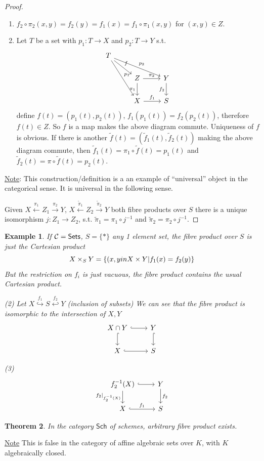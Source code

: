 \documentclass[11pt]{article}
\newtheorem{thm}{Theorem}[section]
\newtheorem{ex}[thm]{Example}
\newcommand{\calc}{{\cal C}}
\newcommand{\lrta}{\longrightarrow}
\newcommand{\inj}{\hookrightarrow}
\begin{document}
\begin{proof}
\ \begin{enumerate}[label=(\arabic*)]
\item $f_2\circ \pi_2(x,y)=f_2(y)=f_1(x)=f_1\circ \pi_1(x,y)$ for $(x,y)\in Z$.
\item Let $T$ be a set with $p_1:T\lrta X$ and $p_2:T\lrta Y$ s.t. $$\begin{tikzcd}
T \arrow[rdd,"p_1"] \arrow[rrd,"p_2"] \ar[rd,"f"] &  &  \\
 & Z \arrow[r, "\pi_2"] \arrow[d, "\pi_1"'] & Y \arrow[d, "f_2"'] \\
 & X \arrow[r, "f_1"] & S
\end{tikzcd}$$
define $f(t)=(p_1(t),p_2(t))$, $f_1(p_1(t))=f_2(p_2(t))$, therefore $f(t)\in Z$. So $f$ is a map makes the  above diagram commute. Uniqueness of $f$ is obvious. If there is  another $\tilde{f}(t)=(\tilde{f}_1(t),\tilde{f}_2(t))$ making the above diagram commute, then $\tilde{f}_1(t)=\pi_1\circ \tilde{f}(t)=p_1(t)$ and $\tilde{f}_2(t)=\pi\circ \tilde{f}(t)=p_2(t)$.
\end{enumerate}
\underline{Note}: This construction/definition is a an example of ``universal'' object in the categorical sense. It is universal in the following sense.

Given $X\overset{\pi_1}{\longleftarrow}Z_1\overset{\pi_2}{\lrta} Y$, $X\overset{\tilde{\pi}_1}{\longleftarrow}Z_2\overset{\tilde{\pi}_2}{\lrta} Y$ both fibre products over $S$ there is a unique isomorphism $j:Z_1\lrta Z_2$, s.t. $\tilde{\pi}_1=\pi_1\circ j^{-1}$ and $\tilde{\pi}_2=\pi_2\circ j^{-1}$.
\end{proof}
\begin{ex}
If $\calc=\mathsf{Sets}$, $S=\{*\}$ any 1 element set, the fibre product over $S$ is just the Cartesian product
$$
X\times_S Y=\{(x,y\\in X\times Y|f_1(x)=f_2(y)\}
$$
But the restriction on $f_i$ is just vacuous, the fibre product contains the usual Cartesian product.

(2) Let $X\overset{f_1}{\inj}S \overset{f_2}{\hookleftarrow} Y$ (inclusion of subsets) We can see that the fibre product is isomorphic to the intersection of $X,Y$
$$
\begin{tikzcd}
X\cap Y \arrow[d, hook] \arrow[r, hook] & Y \arrow[d, hook] \\
X \arrow[r, hook] & S
\end{tikzcd}
$$

(3) $$
\begin{tikzcd}
f_2^{-1}(X) \arrow[d, "f_2|_{f^{-1}_2(X)}"'] \arrow[r, hook] & Y \arrow[d, "f_2"] \\
X \arrow[r, "f_1", hook] & S
\end{tikzcd}
$$
\end{ex}
\begin{thm}
In the category $\mathsf{Sch}$ of schemes, arbitrary fibre product exists.
\end{thm}
\underline{Note} This is false in the category of affine algebraic sets over $K$, with $K$ algebraically closed.
\end{document}
